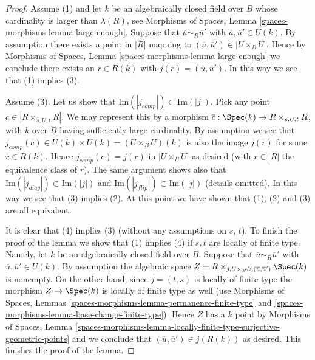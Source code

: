 \begin{proof}
\medskip\noindent
Assume (1) and let $k$ be an algebraically closed field over $B$ whose
cardinality is larger than $\lambda(R)$, see
Morphisms of Spaces, Lemma \ref{spaces-morphisms-lemma-large-enough}.
Suppose that $\overline{u} \sim_R \overline{u}'$ with
$\overline{u}, \overline{u}' \in U(k)$. By assumption there exists
a point in $|R|$ mapping to $(\overline{u}, \overline{u}') \in |U \times_B U|$.
Hence by
Morphisms of Spaces, Lemma \ref{spaces-morphisms-lemma-large-enough}
we conclude there exists an $\overline{r} \in R(k)$ with
$j(\overline{r}) = (\overline{u}, \overline{u}')$. In this way we see
that (1) implies (3).

\medskip\noindent
Assume (3). Let us show that
$\text{Im}(|j_{comp}|) \subset \text{Im}(|j|)$. Pick any point
$c \in |R \times_{s, U, t} R|$. We may represent this by a morphism
$\overline{c} : \Spec(k) \to R \times_{s, U, t} R$, with $k$ over $B$
having sufficiently large cardinality. By assumption we see that
$j_{comp}(\overline{c}) \in U(k) \times U(k) = (U \times_B U)(k)$
is also the image $j(\overline{r})$ for some $\overline{r} \in R(k)$.
Hence $j_{comp}(c) = j(r)$ in $|U \times_B U|$ as desired (with
$r \in |R|$ the equivalence class of $\overline{r}$). The same argument
shows also that $\text{Im}(|j_{diag}|) \subset \text{Im}(|j|)$ and
$\text{Im}(|j_{flip}|) \subset \text{Im}(|j|)$ (details omitted).
In this way we see that (3) implies (2). At this point we have
shown that (1), (2) and (3) are all equivalent.

\medskip\noindent
It is clear that (4) implies (3) (without any assumptions on $s$, $t$).
To finish the proof of the lemma we show that (1) implies (4) if $s, t$
are locally of finite type. Namely, let $k$ be an algebraically closed
field over $B$. Suppose that $\overline{u} \sim_R \overline{u}'$ with
$\overline{u}, \overline{u}' \in U(k)$. By assumption the algebraic space
$Z = R \times_{j, U \times_B U, (\overline{u}, \overline{u}')} \Spec(k)$
is nonempty. On the other hand, since $j = (t, s)$ is locally of finite type
the morphism $Z \to \Spec(k)$ is locally of finite type as well (use
Morphisms of Spaces, Lemmas \ref{spaces-morphisms-lemma-permanence-finite-type}
and \ref{spaces-morphisms-lemma-base-change-finite-type}).
Hence $Z$ has a $k$ point by
Morphisms of Spaces, Lemma
\ref{spaces-morphisms-lemma-locally-finite-type-surjective-geometric-points}
and we conclude that $(\overline{u}, \overline{u}') \in j(R(k))$
as desired. This finishes the proof of the lemma.
\end{proof}

